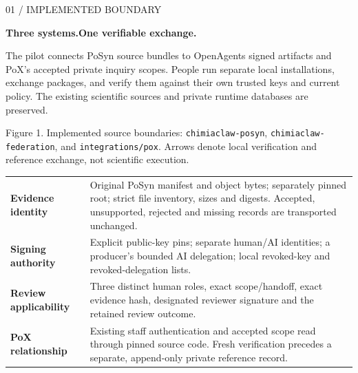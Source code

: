 \documentclass[10pt,a4paper]{article}
\newcommand{\sub}[1]{\vspace{3mm}{\large\sffamily\bfseries\color{ink}#1}\par}
\newcommand{\lead}[2]{{\small\sffamily\color{teal}#1}\par{\huge\sffamily\bfseries\color{ink}#2}\par\vspace{3mm}}
\begin{document}
\lead{01 / IMPLEMENTED BOUNDARY}{Three systems.\newline One verifiable exchange.}
The pilot connects PoSyn source bundles to OpenAgents signed artifacts and PoX's
accepted private inquiry scopes. People run separate local installations, exchange
packages, and verify them against their own trusted keys and current policy.
The existing scientific sources and private runtime databases are preserved.

\begin{center}
\end{center}
{\footnotesize\color{grey}Figure 1. Implemented source boundaries: \texttt{chimiaclaw-posyn}, \texttt{chimiaclaw-federation}, and \texttt{integrations/pox}. Arrows denote local verification and reference exchange, not scientific execution.}

\sub{What the recipient can verify}
\begin{tabularx}{\textwidth}{@{}p{35mm}Y@{}}\toprule
\textbf{Evidence identity} & Original PoSyn manifest and object bytes; separately pinned root; strict file inventory, sizes and digests. Accepted, unsupported, rejected and missing records are transported unchanged.\\\addlinespace
\textbf{Signing authority} & Explicit public-key pins; separate human/AI identities; a producer's bounded AI delegation; local revoked-key and revoked-delegation lists.\\\addlinespace
\textbf{Review applicability} & Three distinct human roles, exact scope/handoff, exact evidence hash, designated reviewer signature and the retained review outcome.\\\addlinespace
\textbf{PoX relationship} & Existing staff authentication and accepted scope read through pinned source code. Fresh verification precedes a separate, append-only private reference record.\\\bottomrule
\end{tabularx}
\end{document}
